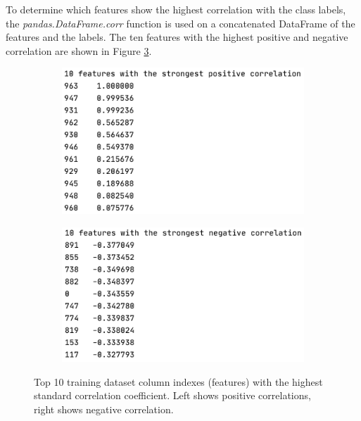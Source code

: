 \documentclass[letterpaper,12pt]{article}
\begin{document}
To determine which features show the highest correlation with the class labels, the \textit{pandas.DataFrame.corr} function is used on a concatenated DataFrame of the features and the labels. The ten features with the highest positive and negative correlation are shown in Figure \ref{fig:correlation-results}.

\begin{figure}[h]
\centering
\begin{subfigure}{.47\textwidth}
  \centering
  \includegraphics[width=\textwidth]{report/figures/corr_pos.png}
  \label{fig:corr_pos}
\end{subfigure}%
\begin{subfigure}{.5\textwidth}
  \centering
  \includegraphics[width=\textwidth]{report/figures/corr_neg.png}
  \label{fig:corr_neg}
\end{subfigure}
\caption{\label{fig:correlation-results}Top 10 training dataset column indexes (features) with the highest standard correlation coefficient. Left shows positive correlations, right shows negative correlation.}
\end{figure}
\end{document}
